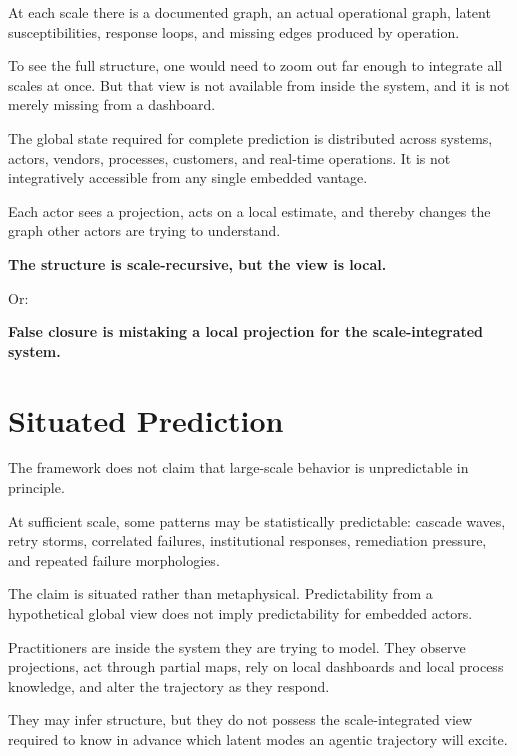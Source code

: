 \documentclass[11pt]{article}
\begin{document}
At each scale there is a documented graph, an actual operational graph, latent susceptibilities, response loops, and missing edges produced by operation.

To see the full structure, one would need to zoom out far enough to integrate all scales at once. But that view is not available from inside the system, and it is not merely missing from a dashboard.

The global state required for complete prediction is distributed across systems, actors, vendors, processes, customers, and real-time operations. It is not integratively accessible from any single embedded vantage.

Each actor sees a projection, acts on a local estimate, and thereby changes the graph other actors are trying to understand.

\begin{pullquote}
\textbf{The structure is scale-recursive, but the view is local.}
\end{pullquote}

Or:

\begin{pullquote}
\textbf{False closure is mistaking a local projection for the scale-integrated system.}
\end{pullquote}

\section{Situated Prediction}

The framework does not claim that large-scale behavior is unpredictable in principle.

At sufficient scale, some patterns may be statistically predictable: cascade waves, retry storms, correlated failures, institutional responses, remediation pressure, and repeated failure morphologies.

The claim is situated rather than metaphysical. Predictability from a hypothetical global view does not imply predictability for embedded actors.

Practitioners are inside the system they are trying to model. They observe projections, act through partial maps, rely on local dashboards and local process knowledge, and alter the trajectory as they respond.

They may infer structure, but they do not possess the scale-integrated view required to know in advance which latent modes an agentic trajectory will excite.
\end{document}
